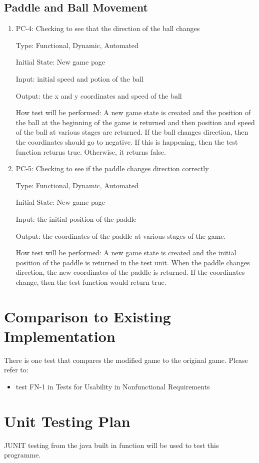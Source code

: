 \documentclass[12pt,letterpaper]{article}
\begin{document}
	\subsection{Paddle and Ball Movement}
	\begin{enumerate}
	\item PC-4: Checking to see that the direction of the ball changes

	Type: Functional, Dynamic, Automated

	Initial State: New game page

	Input: initial speed and potion of the ball

	Output: the x and y coordinates and speed of the ball

	How test will be performed: A new game state is created and the position of the ball at the beginning of the game is returned and then position and speed of the ball at various stages are returned. If the ball changes direction, then the coordinates should go to negative. If this is happening, then the test function returns true. Otherwise, it returns false.

	\item PC-5: Checking to see if the paddle changes direction correctly

	Type: Functional, Dynamic, Automated
	
	Initial State: New game page

	Input: the initial position of the paddle

	Output: the coordinates of the paddle at various stages of the game.

	How test will be performed: A new game state is created and the initial position of the paddle is returned in the test unit. When the paddle changes direction, the new coordinates of the paddle is returned. If the coordinates change, then the test function would return true.
	\end{enumerate}

	\section{Comparison to Existing Implementation}
	 There is one test that compares the modified game to the original game. Please refer to:
	\begin{itemize}
	\item test FN-1 in Tests for Usability in Nonfunctional Requirements
	\end{itemize}

	\section{Unit Testing Plan}
	JUNIT testing from the java built in function will be used to test this programme.
\end{document}
